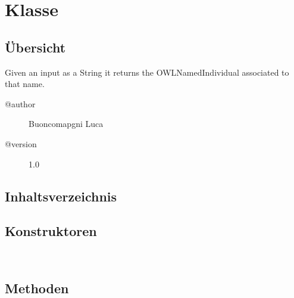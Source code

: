 
\section[AsOWLIndividual]{Klasse }\label{ontologyFramework.OFEventManagement.OFEventParameter.AsOWLIndividual-class}
\subsection{Übersicht}
Given an input as a String it returns the OWLNamedIndividual associated to that name.
\begin{description}
\item[@author] 
Buoncomapgni Luca
\item[@version] 
1.0
\end{description}
\subsection{Inhaltsverzeichnis}
\subsection{Konstruktoren}
\begin{description}
\item[{\label{ontologyFramework.OFEventManagement.OFEventParameter.AsOWLIndividual()}}]
~ 
\end{description}
\subsection{Methoden}
\begin{description}
\item[{\label{ontologyFramework.OFEventManagement.OFEventParameter.AsOWLIndividual.getParameter(java.lang.Object,ontologyFramework.OFContextManagement.OWLReferences)}}]
~ 
\end{description}
